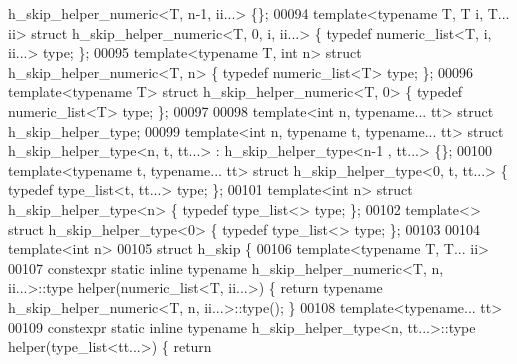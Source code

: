 \begin{DoxyCode}
      h\_skip\_helper\_numeric<T, n-1, ii...> \{\};
00094 \textcolor{keyword}{template}<\textcolor{keyword}{typename} T, T i, T... ii>        \textcolor{keyword}{struct }h\_skip\_helper\_numeric<T, 0, i, ii...> \{ \textcolor{keyword}{typedef} 
      numeric\_list<T, i, ii...> type; \};
00095 \textcolor{keyword}{template}<\textcolor{keyword}{typename} T, \textcolor{keywordtype}{int} n>               \textcolor{keyword}{struct }h\_skip\_helper\_numeric<T, n>           \{ \textcolor{keyword}{typedef} 
      numeric\_list<T> type; \};
00096 \textcolor{keyword}{template}<\textcolor{keyword}{typename} T>                      \textcolor{keyword}{struct }h\_skip\_helper\_numeric<T, 0>           \{ \textcolor{keyword}{typedef} 
      numeric\_list<T> type; \};
00097 
00098 \textcolor{keyword}{template}<\textcolor{keywordtype}{int} n, \textcolor{keyword}{typename}... tt>             \textcolor{keyword}{struct }h\_skip\_helper\_type;
00099 \textcolor{keyword}{template}<\textcolor{keywordtype}{int} n, \textcolor{keyword}{typename} t, \textcolor{keyword}{typename}... tt> \textcolor{keyword}{struct }h\_skip\_helper\_type<n, t, tt...> : h\_skip\_helper\_type<n-1
      , tt...> \{\};
00100 \textcolor{keyword}{template}<\textcolor{keyword}{typename} t, \textcolor{keyword}{typename}... tt>        \textcolor{keyword}{struct }h\_skip\_helper\_type<0, t, tt...> \{ \textcolor{keyword}{typedef} type\_list<t, 
      tt...> type; \};
00101 \textcolor{keyword}{template}<\textcolor{keywordtype}{int} n>                             \textcolor{keyword}{struct }h\_skip\_helper\_type<n>           \{ \textcolor{keyword}{typedef} type\_list<> 
      type; \};
00102 \textcolor{keyword}{template}<>                                  \textcolor{keyword}{struct }h\_skip\_helper\_type<0>           \{ \textcolor{keyword}{typedef} type\_list<> 
      type; \};
00103 
00104 \textcolor{keyword}{template}<\textcolor{keywordtype}{int} n>
00105 \textcolor{keyword}{struct }h\_skip \{
00106   \textcolor{keyword}{template}<\textcolor{keyword}{typename} T, T... ii>
00107   constexpr \textcolor{keyword}{static} \textcolor{keyword}{inline} \textcolor{keyword}{typename} h\_skip\_helper\_numeric<T, n, ii...>::type helper(numeric\_list<T, ii...>) 
      \{ \textcolor{keywordflow}{return} \textcolor{keyword}{typename} h\_skip\_helper\_numeric<T, n, ii...>::type(); \}
00108   \textcolor{keyword}{template}<\textcolor{keyword}{typename}... tt>
00109   constexpr \textcolor{keyword}{static} \textcolor{keyword}{inline} \textcolor{keyword}{typename} h\_skip\_helper\_type<n, tt...>::type helper(type\_list<tt...>) \{ \textcolor{keywordflow}{return} \textcolor{keyword}{
}
\end{DoxyCode}
